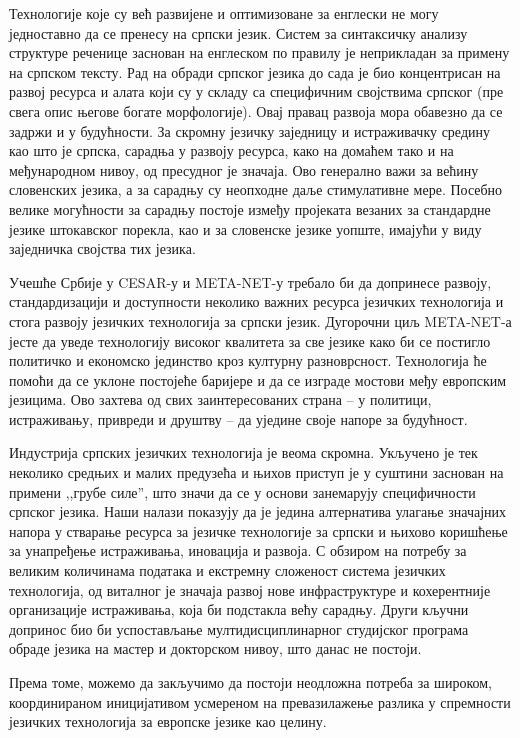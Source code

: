 \begin{multicols}{2}
Технологије које су већ развијене и оптимизоване за енглески не могу једноставно да се пренесу на српски језик. Систем за синтаксичку анализу структуре реченице заснован на енглеском по правилу је неприкладан за примену на српском тексту. Рад на обради српског језика до сада је био концентрисан на развој ресурса и алата који су у складу са специфичним својствима српског (пре свега опис његове богате морфологије). Овај правац развоја мора обавезно да се задржи и у будућности. 
За скромну језичку заједницу и истраживачку средину као што је српска, сарадња у развоју ресурса, како на домаћем тако и на међународном нивоу,  од пресудног је значаја. Ово генерално  важи за већину словенских језика, а за сарадњу су неопходне даље стимулативне мере. Посебно велике могућности за сарадњу постоје између пројеката везаних за стандардне језике штокавског порекла, као и за словенске језике уопште, имајући у виду заједничка својства тих језика. 

Учешће Србије у CESAR-у и META-NET-у требало би да допринесе развоју, стандардизацији и доступности неколико важних ресурса језичких технологија и стога развоју језичких технологија за српски језик. Дугорочни циљ META-NET-а јесте да уведе технологију високог квалитета за све језике како би се постигло политичко и економско јединство кроз културну разноврсност. Технологија ће помоћи да се уклоне постојеће баријере и да се изграде мостови међу европским језицима. Ово захтева од свих заинтересованих страна – у политици, истраживању, привреди и друштву – да уједине своје напоре за будућност. 

Индустрија српских језичких технологија је веома скромна. Укључено је тек неколико средњих и малих предузећа и њихов приступ је у суштини заснован на примени ,,грубе силе'', што значи да се у основи занемарују специфичности српског језика. Наши налази показују да је једина алтернатива улагање значајних напора у стварање ресурса за језичке технологије за српски и њихово коришћење за унапређење истраживања, иновација и развоја. С обзиром на потребу за великим количинама података и екстремну сложеност система језичких технологија, од виталног је значаја развој нове инфраструктуре и кохерентније организације истраживања, која би подстакла већу сарадњу. Други кључни допринос био би успостављање мул\-ти\-дис\-ци\-пли\-нар\-ног студијског програма обраде језика на мастер и докторском нивоу, што данас не постоји.

Према томе, можемо да закључимо да постоји неодложна потреба за широком, координираном иницијативом усмереном на превазилажење разлика у спремности језичких технологија за европске језике као целину. 



\end{multicols}
